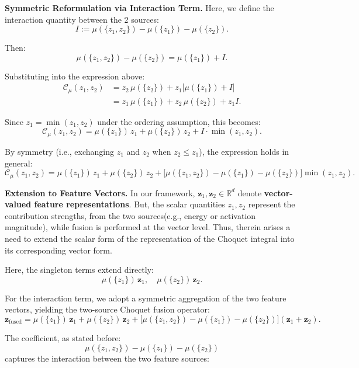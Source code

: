 \documentclass[preprint,12pt]{elsarticle}
\begin{document}
\medskip

\noindent\textbf{Symmetric Reformulation via Interaction Term.}
Here, we define the interaction quantity between the 2 sources:
\[
I := \mu(\{z_1, z_2\}) - \mu(\{z_1\}) - \mu(\{z_2\}).
\]

Then:
\[
\mu(\{z_1, z_2\}) - \mu(\{z_2\}) = \mu(\{z_1\}) + I.
\]

Substituting into the expression above:
\begin{align*}
\mathcal{C}_\mu(z_1, z_2)
&= z_2\,\mu(\{z_2\})
+ z_1\bigl[\mu(\{z_1\}) + I\bigr] \\
&= z_1\,\mu(\{z_1\}) + z_2\,\mu(\{z_2\}) + z_1 I.
\end{align*}

Since $z_1 = \min(z_1, z_2)$ under the ordering assumption, this becomes:
\[
\mathcal{C}_\mu(z_1, z_2)
=
\mu(\{z_1\})\, z_1
+
\mu(\{z_2\})\, z_2
+
I \cdot \min(z_1, z_2).
\]

By symmetry (i.e., exchanging $z_1$ and $z_2$ when $z_2 \leq z_1$), the expression holds in general:
\begin{equation*}
\mathcal{C}_\mu(z_1, z_2)
=
\mu(\{z_1\})\, z_1
+
\mu(\{z_2\})\, z_2
+
\bigl[\mu(\{z_1, z_2\}) - \mu(\{z_1\}) - \mu(\{z_2\})\bigr]
\min(z_1, z_2).
\end{equation*}

\medskip

\noindent\textbf{Extension to Feature Vectors.}
In our framework, $\mathbf{z}_1, \mathbf{z}_2 \in \mathbb{R}^d$ denote \textbf{vector-valued feature representations}. But, the scalar quantities $z_1, z_2$ represent the contribution strengths, from the two sources(e.g., energy or activation magnitude), while fusion is performed at the vector level. Thus, therein arises a need to extend the scalar form of the representation of the Choquet integral into its corresponding vector form.

Here, the singleton terms extend directly:
\[
\mu(\{z_1\})\, \mathbf{z}_1, \quad \mu(\{z_2\})\, \mathbf{z}_2.
\]

For the interaction term, we adopt a symmetric aggregation of the two feature vectors, yielding the two-source Choquet fusion operator:
\begin{equation*}
\mathbf{z}_{\text{fused}} 
= \mu(\{z_1\})\, \mathbf{z}_1 
+ \mu(\{z_2\})\, \mathbf{z}_2 
+ \bigl[\mu(\{z_1, z_2\}) - \mu(\{z_1\}) - \mu(\{z_2\})\bigr]
(\mathbf{z}_1 + \mathbf{z}_2).
\end{equation*}

The coefficient, as stated before:
\[
\mu(\{z_1, z_2\}) - \mu(\{z_1\}) - \mu(\{z_2\})
\]
captures the interaction between the two feature sources:
\end{document}
